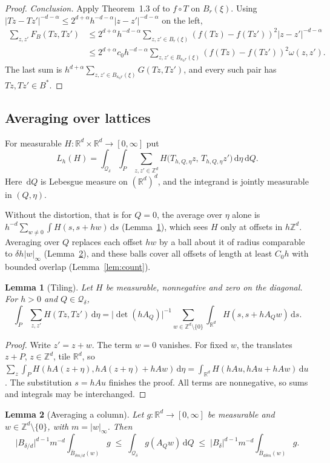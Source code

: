 \documentclass[11pt]{amsart}
\newtheorem{lemma}{Lemma}
\theoremstyle{remark}
\newcommand{\R}{\mathbb{R}}
\newcommand{\Z}{\mathbb{Z}}
\newcommand{\dd}{\,\mathrm{d}}
\newcommand{\abs}[1]{\lvert #1\rvert}
\newcommand{\norm}[1]{\lvert #1\rvert}
\newcommand{\supn}[1]{\lvert #1\rvert_\infty}
\newcommand{\1}{\mathbf{1}}
\newcommand{\Qd}{\mathcal{Q}_\delta}
\begin{document}
\begin{proof}
\emph{Conclusion.} Apply Theorem~1.3 of \cite{BKS} to $f\circ T$ on $B_r(\xi)$. Using
$\norm{Tz-Tz'}^{-d-\alpha}\le2^{d+\alpha}h^{-d-\alpha}\norm{z-z'}^{-d-\alpha}$ on the left,
\begin{align*}
  \sum_{z,z'}F_B(Tz,Tz')
  &\le2^{d+\alpha}h^{-d-\alpha}\sum_{z,z'\in B_r(\xi)}(f(Tz)-f(Tz'))^2\norm{z-z'}^{-d-\alpha}\\
  &\le2^{d+\alpha}c_0h^{-d-\alpha}\sum_{z,z'\in B_{\kappa_0r}(\xi)}(f(Tz)-f(Tz'))^2\omega(z,z').
\end{align*}
The last sum is $h^{d+\alpha}\sum_{z,z'\in B_{\kappa_0r}(\xi)}G(Tz,Tz')$, and every such pair has
$Tz,Tz'\in B^*$.
\end{proof}

\subsection{Averaging over lattices}

For measurable $H\colon\R^d\times\R^d\to[0,\infty]$ put
\[
  L_h(H)=\int_{\Qd}\int_P\sum_{z,z'\in\Z^d}H\bigl(T_{h,Q,\eta}z,\,T_{h,Q,\eta}z'\bigr)\dd\eta\dd Q .
\]
Here $\dd Q$ is Lebesgue measure on $(\R^d)^d$, and the integrand is jointly measurable in
$(Q,\eta)$.

Without the distortion, that is for $Q=0$, the average over $\eta$ alone is
$h^{-d}\sum_{w\ne0}\int H(s,s+hw)\dd s$ (Lemma~\ref{lem:tiling}), which sees $H$ only at offsets in
$h\Z^d$. Averaging over $Q$ replaces each offset $hw$ by a ball about it of radius comparable to
$\delta h\supn w$ (Lemma~\ref{lem:column}), and these balls cover all offsets of length at least
$C_0h$ with bounded overlap (Lemma~\ref{lem:count}).

\begin{lemma}[Tiling]\label{lem:tiling}
Let $H$ be measurable, nonnegative and zero on the diagonal. For $h>0$ and $Q\in\Qd$,
\[
  \int_P\sum_{z,z'}H(Tz,Tz')\dd\eta=\abs{\det(hA_Q)}^{-1}\sum_{w\in\Z^d\setminus\{0\}}
  \int_{\R^d}H(s,s+hA_Qw)\dd s .
\]
\end{lemma}

\begin{proof}
Write $z'=z+w$. The term $w=0$ vanishes. For fixed $w$, the translates $z+P$, $z\in\Z^d$, tile
$\R^d$, so $\sum_z\int_PH(hA(z+\eta),hA(z+\eta)+hAw)\dd\eta=\int_{\R^d}H(hAu,hAu+hAw)\dd u$.
The substitution $s=hAu$ finishes the proof. All terms are nonnegative, so sums and integrals
may be interchanged.
\end{proof}

\begin{lemma}[Averaging a column]\label{lem:column}
Let $g\colon\R^d\to[0,\infty]$ be measurable and $w\in\Z^d\setminus\{0\}$, with $m=\supn w$. Then
\[
  \abs{B_{\delta/d}}^{d-1}m^{-d}\int_{\bar B_{\delta m/d}(w)}g
  \;\le\;\int_{\Qd}g(A_Qw)\dd Q\;\le\;\abs{B_\delta}^{d-1}m^{-d}\int_{\bar B_{d\delta m}(w)}g .
\]
\end{lemma}
\end{document}

